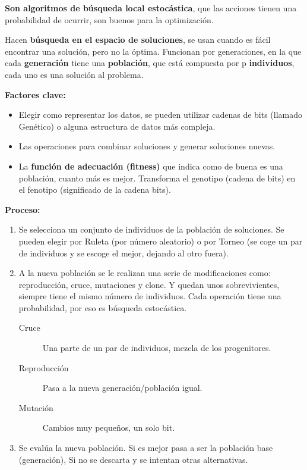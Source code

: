\documentclass[12pt, twoside, openright]{report} %
\begin{document}
\textbf{Son algoritmos de búsqueda local estocástica}, que las acciones tienen una probabilidad de ocurrir, son buenos para la optimización.

Hacen \textbf{búsqueda en el espacio de soluciones}, se usan cuando es fácil encontrar una solución, pero no la óptima. Funcionan por generaciones, en la que cada \textbf{generación} tiene una \textbf{población}, que está compuesta por p \textbf{individuos}, cada uno es una solución al problema.

\textbf{Factores clave:}
\begin{itemize}
	\item Elegir como representar los datos, se pueden utilizar cadenas de bits (llamado Genético) o alguna estructura de datos más compleja.
	\item Las operaciones para combinar soluciones y generar soluciones nuevas.
	\item La \textbf{función de adecuación (fitness)} que indica como de buena es una población, cuanto más es mejor. Transforma el genotipo (cadena de bits) en el fenotipo (significado de la cadena bits).
\end{itemize}

\textbf{Proceso:}
\begin{enumerate}
	\item Se selecciona un conjunto de individuos de la población de soluciones. Se pueden elegir por Ruleta (por número aleatorio) o por Torneo (se coge un par de individuos y se escoge el mejor, dejando al otro fuera).
	\item A la nueva población se le realizan una serie de modificaciones como: reproducción, cruce, mutaciones y clone. Y quedan unos sobrevivientes, siempre tiene el mismo número de individuos.
	      Cada operación tiene una probabilidad, por eso es búsqueda estocástica.
	      \begin{description}
		      \item[Cruce] Una parte de un par de individuos, mezcla de los progenitores.
		      \item[Reproducción] Pasa a la nueva generación/población igual.
		      \item[Mutación] Cambios muy pequeños, un solo bit.
	      \end{description}
	\item Se evalúa la nueva población. Si es mejor pasa a ser la población base (generación), Si no se descarta y se intentan otras alternativas.
\end{enumerate}
\end{document}
